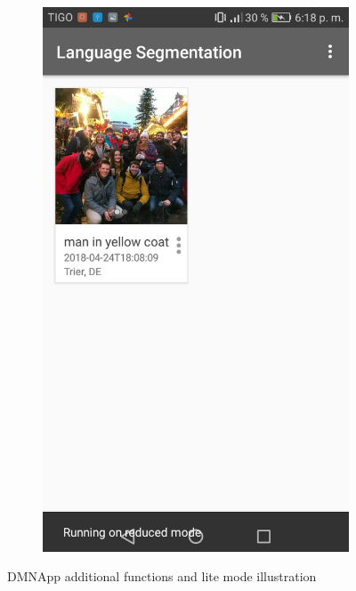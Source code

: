 \begin{figure}[!htbp]
\begin{multicols}{3}
    \begin{subfigure}[b]{\columnwidth}
            \centering
            \includegraphics[width=\textwidth]{./figures/dmn_app/views/17.png}
    \label{subfig:limited}
    \end{subfigure}
    \end{multicols}
    \caption{DMNApp additional functions and lite mode illustration}
    \label{Fig:Additional}
\end{figure}